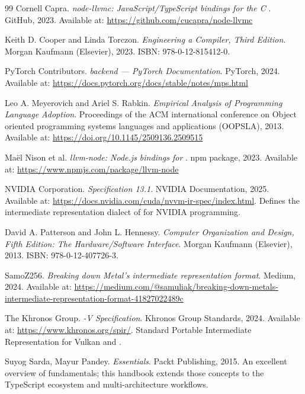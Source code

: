 \begin{thebibliography}{99}
Cornell Capra. \textit{node-llvmc: JavaScript/TypeScript  bindings for the  C }. GitHub, 2023. Available at: \url{https://github.com/cucapra/node-llvmc}

Keith D. Cooper and Linda Torczon. \textit{Engineering a Compiler, Third Edition}. Morgan Kaufmann (Elsevier), 2023. ISBN: 978-0-12-815412-0.

PyTorch Contributors. \textit{ backend --- PyTorch Documentation}. PyTorch, 2024. Available at: \url{https://docs.pytorch.org/docs/stable/notes/mps.html}

Leo A. Meyerovich and Ariel S. Rabkin. \textit{Empirical Analysis of Programming Language Adoption}. Proceedings of the ACM international conference on Object oriented programming systems languages and applications (OOPSLA), 2013. Available at: \url{https://doi.org/10.1145/2509136.2509515}

Maël Nison et al. \textit{llvm-node: Node.js bindings for }. npm package, 2023. Available at: \url{https://www.npmjs.com/package/llvm-node}

NVIDIA Corporation. \textit{  Specification 13.1}. NVIDIA  Documentation, 2025. Available at: \url{https://docs.nvidia.com/cuda/nvvm-ir-spec/index.html}. Defines the  intermediate representation dialect of   for NVIDIA  programming.

David A. Patterson and John L. Hennessy. \textit{Computer Organization and Design, Fifth Edition: The Hardware/Software Interface}. Morgan Kaufmann (Elsevier), 2013. ISBN: 978-0-12-407726-3.

SamoZ256. \textit{Breaking down Metal's intermediate representation format}. Medium, 2024. Available at: \url{https://medium.com/@samuliak/breaking-down-metals-intermediate-representation-format-41827022489c}

The Khronos Group. \textit{-V Specification}. Khronos Group Standards, 2024. Available at: \url{https://www.khronos.org/spir/}. Standard Portable Intermediate Representation for Vulkan and .

Suyog Sarda, Mayur Pandey. \textit{ Essentials}. Packt Publishing, 2015. An excellent overview of  fundamentals; this handbook extends those concepts to the TypeScript ecosystem and multi-architecture workflows.


\end{thebibliography}
